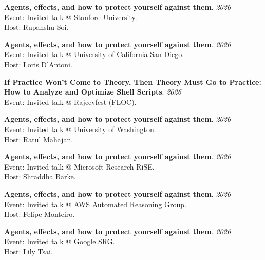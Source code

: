 \begin{minipage}{\textwidth}
\textbf{Agents, effects, and how to protect yourself against them}. \hfill {\em 2026}\\
Event: Invited talk @ Stanford University.\\
 Host: Rupanshu Soi.
\end{minipage}

\begin{minipage}{\textwidth}
\textbf{Agents, effects, and how to protect yourself against them}. \hfill {\em 2026}\\
Event: Invited talk @ University of California San Diego.\\
 Host: Loris D'Antoni.
\end{minipage}

\begin{minipage}{\textwidth}
\textbf{If Practice Won't Come to Theory, Then Theory Must Go to Practice: How to Analyze and Optimize Shell Scripts}. \hfill {\em 2026}\\
Event: Invited talk @ Rajeevfest (FLOC).
\end{minipage}

\begin{minipage}{\textwidth}
\textbf{Agents, effects, and how to protect yourself against them}. \hfill {\em 2026}\\
Event: Invited talk @ University of Washington.\\
 Host: Ratul Mahajan.
\end{minipage}

\begin{minipage}{\textwidth}
\textbf{Agents, effects, and how to protect yourself against them}. \hfill {\em 2026}\\
Event: Invited talk @ Microsoft Research RiSE.\\
 Host: Shraddha Barke.
\end{minipage}

\begin{minipage}{\textwidth}
\textbf{Agents, effects, and how to protect yourself against them}. \hfill {\em 2026}\\
Event: Invited talk @ AWS Automated Reasoning Group.\\
 Host: Felipe Monteiro.
\end{minipage}

\begin{minipage}{\textwidth}
\textbf{Agents, effects, and how to protect yourself against them}. \hfill {\em 2026}\\
Event: Invited talk @ Google SRG.\\
 Host: Lily Tsai.
\end{minipage}

